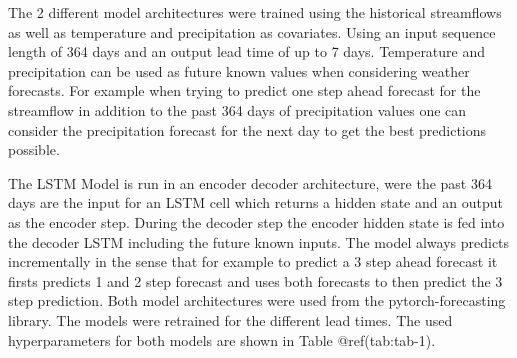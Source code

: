 \documentclass[
]{article}
\begin{document}
The 2 different model architectures were trained using the historical
streamflows as well as temperature and precipitation as covariates.
Using an input sequence length of 364 days and an output lead time of up
to 7 days. Temperature and precipitation can be used as future known
values when considering weather forecasts. For example when trying to
predict one step ahead forecast for the streamflow in addition to the
past 364 days of precipitation values one can consider the precipitation
forecast for the next day to get the best predictions possible.

The LSTM Model is run in an encoder decoder architecture, were the past
364 days are the input for an LSTM cell which returns a hidden state and
an output as the encoder step. During the decoder step the encoder
hidden state is fed into the decoder LSTM including the future known
inputs. The model always predicts incrementally in the sense that for
example to predict a 3 step ahead forecast it firsts predicts 1 and 2
step forecast and uses both forecasts to then predict the 3 step
prediction. Both model architectures were used from the
pytorch-forecasting library. The models were retrained for the different
lead times. The used hyperparameters for both models are shown in Table
@ref(tab:tab-1).
\end{document}
